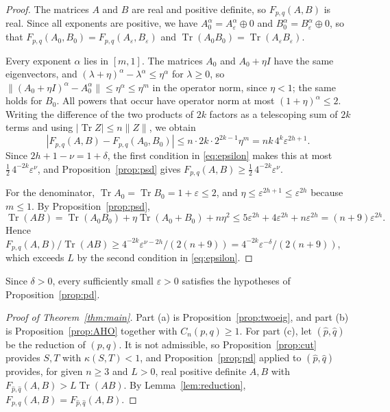 \documentclass{amsart}
\theoremstyle{definition}
\theoremstyle{remark}
\numberwithin{equation}{section}
\newcommand{\Tr}{\operatorname{Tr}}
\newcommand{\cut}{\kappa}
\begin{document}
\begin{proof}
The matrices $A$ and $B$ are real and positive definite, so $F_{p,q}(A,B)$ is real. Since all exponents are positive, we have $A_0^{\alpha}=A_\varepsilon^{\alpha}\oplus 0$ and $B_0^{\alpha}=B_\varepsilon^{\alpha}\oplus 0$, so that $F_{p,q}(A_0,B_0)=F_{p,q}(A_\varepsilon,B_\varepsilon)$ and $\Tr(A_0B_0)=\Tr(A_\varepsilon B_\varepsilon)$.

Every exponent $\alpha$ lies in $[m,1]$. The matrices $A_0$ and $A_0+\eta I$ have the same eigenvectors, and $(\lambda+\eta)^\alpha-\lambda^\alpha\le\eta^\alpha$ for $\lambda\ge 0$, so $\|(A_0+\eta I)^\alpha-A_0^\alpha\|\le\eta^\alpha\le\eta^m$ in the operator norm, since $\eta<1$; the same holds for $B_0$. All powers that occur have operator norm at most $(1+\eta)^\alpha\le 2$. Writing the difference of the two products of $2k$ factors as a telescoping sum of $2k$ terms and using $|\Tr Z|\le n\|Z\|$, we obtain
\[
|F_{p,q}(A,B)-F_{p,q}(A_0,B_0)|\le n\cdot 2k\cdot 2^{2k-1}\eta^m=nk\,4^{k}\varepsilon^{2h+1}.
\]
Since $2h+1-\nu=1+\delta$, the first condition in \eqref{eq:epsilon} makes this at most $\tfrac12\,4^{-2k}\varepsilon^{\nu}$, and Proposition~\ref{prop:psd} gives $F_{p,q}(A,B)\ge\tfrac12\,4^{-2k}\varepsilon^{\nu}$.

For the denominator, $\Tr A_0=\Tr B_0=1+\varepsilon\le 2$, and $\eta\le\varepsilon^{2h+1}\le\varepsilon^{2h}$ because $m\le 1$. By Proposition~\ref{prop:psd},
\[
\Tr(AB)=\Tr(A_0B_0)+\eta\Tr(A_0+B_0)+n\eta^2\le 5\varepsilon^{2h}+4\varepsilon^{2h}+n\varepsilon^{2h}=(n+9)\varepsilon^{2h}.
\]
Hence $F_{p,q}(A,B)/\Tr(AB)\ge 4^{-2k}\varepsilon^{\nu-2h}/(2(n+9))=4^{-2k}\varepsilon^{-\delta}/(2(n+9))$, which exceeds $L$ by the second condition in \eqref{eq:epsilon}.
\end{proof}

Since $\delta>0$, every sufficiently small $\varepsilon>0$ satisfies the hypotheses of Proposition~\ref{prop:pd}.

\begin{proof}[Proof of Theorem~\ref{thm:main}]
Part (a) is Proposition~\ref{prop:twoeig}, and part (b) is Proposition~\ref{prop:AHO} together with $C_n(p,q)\ge 1$. For part (c), let $(\hat p,\hat q)$ be the reduction of $(p,q)$. It is not admissible, so Proposition~\ref{prop:cut} provides $S,T$ with $\cut(S,T)<1$, and Proposition~\ref{prop:pd} applied to $(\hat p,\hat q)$ provides, for given $n\ge 3$ and $L>0$, real positive definite $A,B$ with $F_{\hat p,\hat q}(A,B)>L\Tr(AB)$. By Lemma~\ref{lem:reduction}, $F_{p,q}(A,B)=F_{\hat p,\hat q}(A,B)$.
\end{proof}
\end{document}
